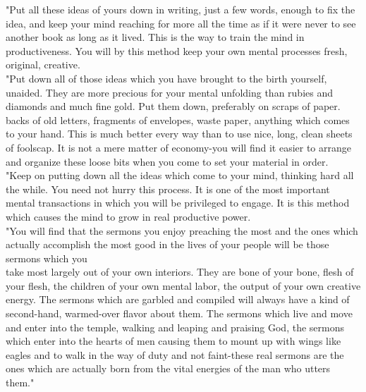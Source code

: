 \documentclass[10pt]{article}
\begin{document}
"Put all these ideas of yours down in writing, just a few words, enough to fix the idea, and keep your mind reaching for more all the time as if it were never to see another book as long as it lived. This is the way to train the mind in productiveness. You will by this method keep your own mental processes fresh, original, creative.\\
"Put down all of those ideas which you have brought to the birth yourself, unaided. They are more precious for your mental unfolding than rubies and diamonds and much fine gold. Put them down, preferably on scraps of paper. backs of old letters, fragments of envelopes, waste paper, anything which comes to your hand. This is much better every way than to use nice, long, clean sheets of foolscap. It is not a mere matter of economy-you will find it easier to arrange and organize these loose bits when you come to set your material in order.\\
"Keep on putting down all the ideas which come to your mind, thinking hard all the while. You need not hurry this process. It is one of the most important mental transactions in which you will be privileged to engage. It is this method which causes the mind to grow in real productive power.\\
"You will find that the sermons you enjoy preaching the most and the ones which actually accomplish the most good in the lives of your people will be those sermons which you\\
take most largely out of your own interiors. They are bone of your bone, flesh of your flesh, the children of your own mental labor, the output of your own creative energy. The sermons which are garbled and compiled will always have a kind of second-hand, warmed-over flavor about them. The sermons which live and move and enter into the temple, walking and leaping and praising God, the sermons which enter into the hearts of men causing them to mount up with wings like eagles and to walk in the way of duty and not faint-these real sermons are the ones which are actually born from the vital energies of the man who utters them."
\end{document}
